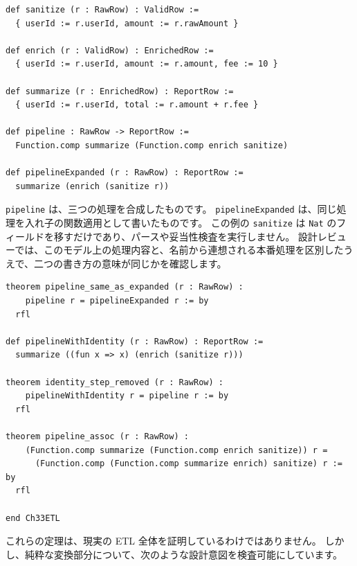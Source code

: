 \begin{listing}[htbp]
\begin{verbatim}
def sanitize (r : RawRow) : ValidRow :=
  { userId := r.userId, amount := r.rawAmount }

def enrich (r : ValidRow) : EnrichedRow :=
  { userId := r.userId, amount := r.amount, fee := 10 }

def summarize (r : EnrichedRow) : ReportRow :=
  { userId := r.userId, total := r.amount + r.fee }

def pipeline : RawRow -> ReportRow :=
  Function.comp summarize (Function.comp enrich sanitize)

def pipelineExpanded (r : RawRow) : ReportRow :=
  summarize (enrich (sanitize r))
\end{verbatim}
\caption{\texttt{sanitize}・\texttt{enrich}・\texttt{summarize}}
\label{lst:ch33-etl-functions}
\end{listing}

\texttt{pipeline} は、三つの処理を合成したものです。
\texttt{pipelineExpanded} は、同じ処理を入れ子の関数適用として書いたものです。
この例の \texttt{sanitize} は \texttt{Nat} のフィールドを移すだけであり、パースや妥当性検査を実行しません。
設計レビューでは、このモデル上の処理内容と、名前から連想される本番処理を区別したうえで、二つの書き方の意味が同じかを確認します。

\begin{listing}[htbp]
\begin{verbatim}
theorem pipeline_same_as_expanded (r : RawRow) :
    pipeline r = pipelineExpanded r := by
  rfl

def pipelineWithIdentity (r : RawRow) : ReportRow :=
  summarize ((fun x => x) (enrich (sanitize r)))

theorem identity_step_removed (r : RawRow) :
    pipelineWithIdentity r = pipeline r := by
  rfl

theorem pipeline_assoc (r : RawRow) :
    (Function.comp summarize (Function.comp enrich sanitize)) r =
      (Function.comp (Function.comp summarize enrich) sanitize) r := by
  rfl

end Ch33ETL
\end{verbatim}
\caption{\texttt{pipeline\_same\_as\_expanded}・\texttt{identity\_step\_removed}・\texttt{pipeline\_assoc}}
\label{lst:ch33-etl-proofs}
\end{listing}

これらの定理は、現実の ETL 全体を証明しているわけではありません。
しかし、純粋な変換部分について、次のような設計意図を検査可能にしています。

